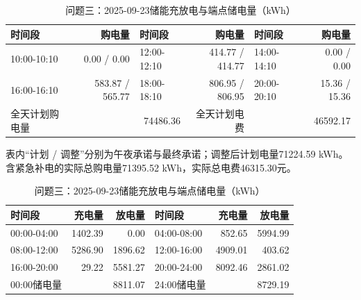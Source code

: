 \begin{table}[H]\centering\small\setlength{\tabcolsep}{5pt}
\caption{问题三：2025-09-23购电结果（电量：kWh；费用：元）}
\begin{tabular}{lrlrlr}\toprule
时间段 & 购电量 & 时间段 & 购电量 & 时间段 & 购电量 \\\midrule
10:00-10:10 & 0.00 / 0.00 & 12:00-12:10 & 414.77 / 414.77 & 14:00-14:10 & 0.00 / 0.00\\
16:00-16:10 & 583.87 / 565.77 & 18:00-18:10 & 806.95 / 806.95 & 20:00-20:10 & 15.36 / 15.36\\
\midrule 全天计划购电量 & \multicolumn{2}{r}{74486.36} & 全天计划电费 & \multicolumn{2}{r}{46592.17}\\\bottomrule
\end{tabular}
\par\vspace{2pt}\footnotesize
表内“计划 / 调整”分别为午夜承诺与最终承诺；调整后计划电量71224.59 kWh。
含紧急补电的实际总购电量71395.52 kWh，实际总电费46315.30元。
\vspace{3pt}\small
\caption{问题三：2025-09-23储能充放电与端点储电量（kWh）}
\begin{tabular}{lrrlrr}\toprule
时间段 & 充电量 & 放电量 & 时间段 & 充电量 & 放电量 \\\midrule
00:00-04:00 & 1402.39 & 0.00 & 04:00-08:00 & 852.65 & 5994.99\\
08:00-12:00 & 5286.90 & 1896.62 & 12:00-16:00 & 4909.01 & 403.62\\
16:00-20:00 & 29.22 & 5581.27 & 20:00-24:00 & 8092.46 & 2861.02\\
\midrule 00:00储电量 & \multicolumn{2}{r}{8811.07} & 24:00储电量 & \multicolumn{2}{r}{8729.19}\\\bottomrule
\end{tabular}\end{table}
